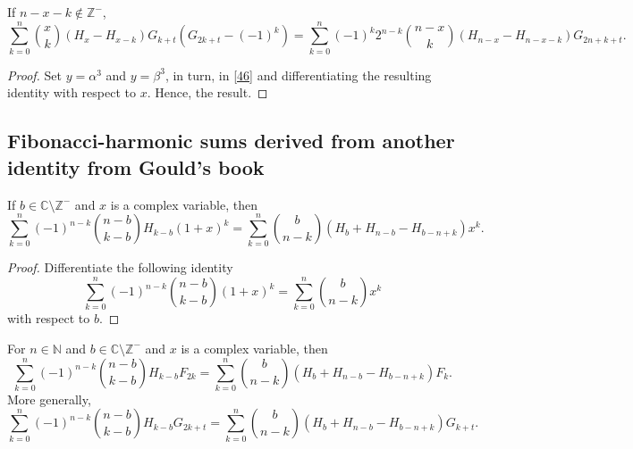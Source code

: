 \documentclass[12pt,reqno]{article}
\begin{document}
	\begin{theorem}
	If $n-x-k\notin\mathbb{Z}^{-}$,
	\begin{equation}
	\sum_{k = 0}^n \binom{x}{k} (H_x-H_{x-k}) G_{k+t}(G_{2k+t}-(-1)^k) = \sum_{k = 0}^n (-1)^k 2^{n-k}\binom{n-x}{k}(H_{n-x}-H_{n-x-k})G_{2n+k+t}.
	\end{equation}
	\end{theorem}
	\begin{proof}
	Set $y=\alpha^3$ and $y=\beta^3$, in turn, in \eqref{46} and differentiating the resulting identity with respect to $x$. Hence, the result.
	\end{proof}
	
	\subsection{Fibonacci-harmonic sums derived from another identity from Gould's book}
	
	\begin{lemma}
	If $b\in\mathbb C\setminus \mathbb{Z}^{-}$ and $x$ is a complex variable, then
	\begin{equation}\label{eq.gldge7l}
	\sum_{k = 0}^n ( - 1)^{n - k} \binom{{n - b}}{{k - b}} H_{k - b} \left( {1 + x} \right)^k 
	= \sum_{k = 0}^n \binom{{b}}{{n - k}}\left( H_b + H_{n - b} - H_{b - n + k} \right)x^k.
	\end{equation}
	\end{lemma}
	\begin{proof}
		Differentiate the following identity \cite[Equation (1.10)]{Gould}
		\begin{equation}
		\sum_{k = 0}^n ( - 1)^{n - k} \binom{{n - b}}{{k - b}}\left( {1 + x} \right)^k = \sum_{k = 0}^n \binom{{b}}{{n - k}}x^k
		\end{equation}
		with respect to $b$.
	\end{proof}
	
	\begin{theorem}
	For $n\in \mathbb{N}$ and $b\in \mathbb{C}\setminus\mathbb{Z}^{-}$ and $x$ is a complex variable, then
	\begin{equation}
	\sum_{k=0}^n (-1)^{n-k} \binom{n-b}{k-b} H_{k-b} F_{2k} = \sum_{k=0}^n \binom{b}{n-k} \left(H_b + H_{n-b} - H_{b-n+k}\right)F_k.
	\end{equation}
	More generally,
	\begin{equation}\label{today55}
	\sum_{k=0}^n (-1)^{n-k} \binom{n-b}{k-b} H_{k-b} G_{2k+t} = \sum_{k=0}^n \binom{b}{n-k} \left(H_b + H_{n-b} - H_{b-n+k}\right)G_{k+t}.
	\end{equation}
	\end{theorem}
	
\end{document}
